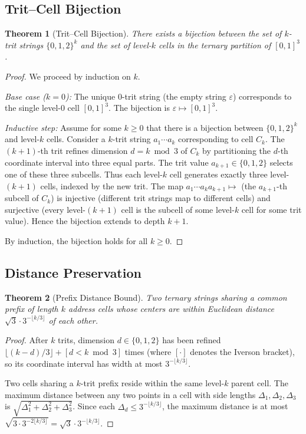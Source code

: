 \documentclass[11pt,twocolumn,a4paper]{article}
\newtheorem{theorem}{Theorem}[section]
\theoremstyle{definition}
\theoremstyle{remark}
\begin{document}
\subsection{Trit--Cell Bijection}
\label{sec:trit-cell}

\begin{theorem}[Trit--Cell Bijection]
\label{thm:trit-cell}
There exists a bijection between the set of $k$-trit strings $\{0,1,2\}^k$ and the set of level-$k$ cells in the ternary partition of $[0,1]^3$.
\end{theorem}

\begin{proof}
We proceed by induction on $k$.

\emph{Base case ($k=0$):} The unique 0-trit string (the empty string $\varepsilon$) corresponds to the single level-0 cell $[0,1]^3$. The bijection is $\varepsilon \mapsto [0,1]^3$.

\emph{Inductive step:} Assume for some $k \geq 0$ that there is a bijection between $\{0,1,2\}^k$ and level-$k$ cells. Consider a $k$-trit string $a_1 \cdots a_k$ corresponding to cell $C_k$. The $(k+1)$-th trit refines dimension $d = k \bmod 3$ of $C_k$ by partitioning the $d$-th coordinate interval into three equal parts. The trit value $a_{k+1} \in \{0,1,2\}$ selects one of these three subcells. Thus each level-$k$ cell generates exactly three level-$(k+1)$ cells, indexed by the new trit. The map $a_1 \cdots a_k a_{k+1} \mapsto$ (the $a_{k+1}$-th subcell of $C_k$) is injective (different trit strings map to different cells) and surjective (every level-$(k+1)$ cell is the subcell of some level-$k$ cell for some trit value). Hence the bijection extends to depth $k+1$.

By induction, the bijection holds for all $k \geq 0$.
\end{proof}

\subsection{Distance Preservation}
\label{sec:distance-preservation}

\begin{theorem}[Prefix Distance Bound]
\label{thm:prefix-distance}
Two ternary strings sharing a common prefix of length $k$ address cells whose centers are within Euclidean distance $\sqrt{3} \cdot 3^{-\lfloor k/3 \rfloor}$ of each other.
\end{theorem}

\begin{proof}
After $k$ trits, dimension $d \in \{0,1,2\}$ has been refined $\lfloor (k-d)/3 \rfloor + [d < k \bmod 3]$ times (where $[\cdot]$ denotes the Iverson bracket), so its coordinate interval has width at most $3^{-\lfloor k/3 \rfloor}$.

Two cells sharing a $k$-trit prefix reside within the same level-$k$ parent cell. The maximum distance between any two points in a cell with side lengths $\Delta_1, \Delta_2, \Delta_3$ is $\sqrt{\Delta_1^2 + \Delta_2^2 + \Delta_3^2}$. Since each $\Delta_d \leq 3^{-\lfloor k/3 \rfloor}$, the maximum distance is at most $\sqrt{3 \cdot 3^{-2\lfloor k/3 \rfloor}} = \sqrt{3} \cdot 3^{-\lfloor k/3 \rfloor}$.
\end{proof}
\end{document}
